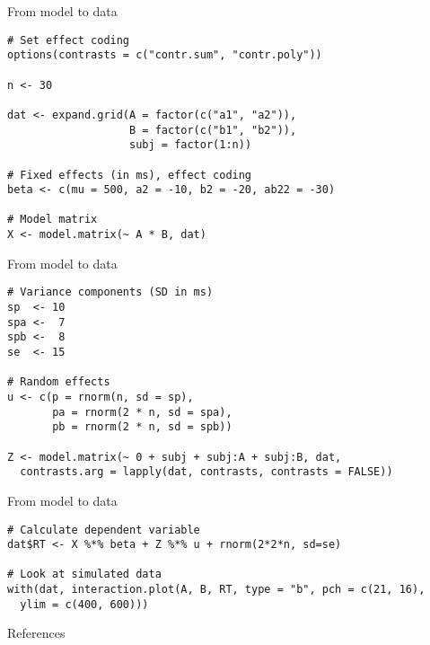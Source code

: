 \documentclass[aspectratio=169]{beamer}
\begin{document}
{

\begin{frame}[fragile]{From model to data}
  \begin{lstlisting}
# Set effect coding 
options(contrasts = c("contr.sum", "contr.poly"))

n <- 30

dat <- expand.grid(A = factor(c("a1", "a2")), 
                   B = factor(c("b1", "b2")),
                   subj = factor(1:n))

# Fixed effects (in ms), effect coding
beta <- c(mu = 500, a2 = -10, b2 = -20, ab22 = -30)

# Model matrix 
X <- model.matrix(~ A * B, dat)
  \end{lstlisting}
\end{frame}

\begin{frame}[fragile]{From model to data}
  \begin{lstlisting}
# Variance components (SD in ms)
sp  <- 10
spa <-  7
spb <-  8
se  <- 15

# Random effects
u <- c(p = rnorm(n, sd = sp), 
       pa = rnorm(2 * n, sd = spa), 
       pb = rnorm(2 * n, sd = spb))

Z <- model.matrix(~ 0 + subj + subj:A + subj:B, dat, 
  contrasts.arg = lapply(dat, contrasts, contrasts = FALSE))
  \end{lstlisting}
\end{frame}


\begin{frame}[fragile]{From model to data}
\begin{lstlisting}
# Calculate dependent variable
dat$RT <- X %*% beta + Z %*% u + rnorm(2*2*n, sd=se)

# Look at simulated data
with(dat, interaction.plot(A, B, RT, type = "b", pch = c(21, 16),
  ylim = c(400, 600)))
\end{lstlisting}
  \nocite{Wickelmaier2022}
\end{frame}

}

% 
% 
% 

\appendix
\begin{frame}{References}


\vfill
\end{frame}
\end{document}
